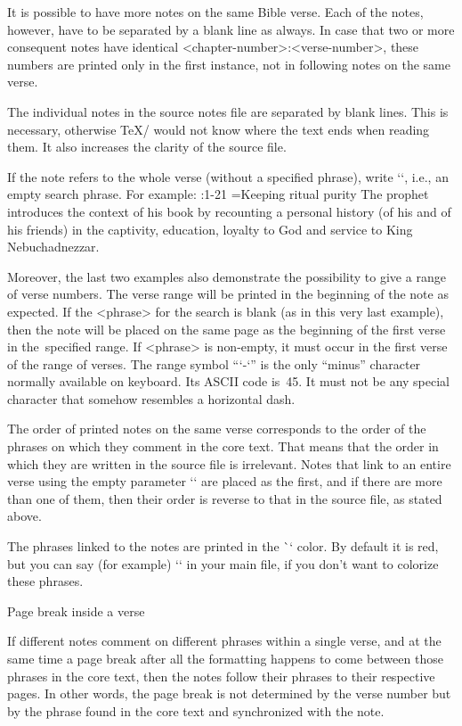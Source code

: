 It is  possible to have more notes on the same Bible verse. Each of the notes, however, have to be separated by a blank line as always. 
In case that two or more consequent notes have identical <chapter-number>:<verse-number>, these numbers are printed only in the first instance, not in following notes on the same verse.

The individual notes in the source notes file are separated by blank
lines. This is necessary, otherwise \TeX/ would not know where the text ends when reading them. 
It also increases the clarity of the source file. 

If the note refers to the whole verse (without a specified phrase), write
`{}`, i.e., an empty search phrase. For example:
\begtt
{}:1-21 {}={Keeping ritual purity}
The prophet introduces the context of his book by recounting a personal history
(of his and of his friends) in the captivity, education, loyalty to God and service 
to King Nebuchadnezzar.
\endtt

Moreover, the last two examples also demonstrate the possibility to give a range of verse numbers.
The verse range will be printed in the beginning of the note as expected.
If the <phrase> for the search is blank (as in this very last example), then the note
will be placed on the same page as the beginning of the first verse in the~specified range.
If <phrase> is non-empty, it must occur in the first verse of the range of verses. 
The range symbol “`-`” is the only “minus” character normally available on
keyboard. Its ASCII code is~45. It must not be any special character that somehow resembles a horizontal 
dash.


The order of printed notes on the same verse corresponds to the order of the phrases on which
they comment in the core text. That means that the order in which they are written 
in the source file is irrelevant. Notes that link to an entire verse using the empty parameter `{}`  are placed as the first, and if there are more than one of them, then their order is reverse to that in the source file, as stated above.

The phrases linked to the notes are printed in the \`\notecolor` color. By default it is red, but you can say (for example) `\let\notecolor=\relax` in your main file, if you don't want to colorize these phrases.


 Page break inside a verse  

If different notes comment on different phrases within a single verse, and at the same time a page break after all the formatting happens to come between those phrases in the core text, then the notes follow their phrases to their respective pages. In other words, the page break is not determined by the verse number but by the phrase found  in the core text and synchronized with the note. 

